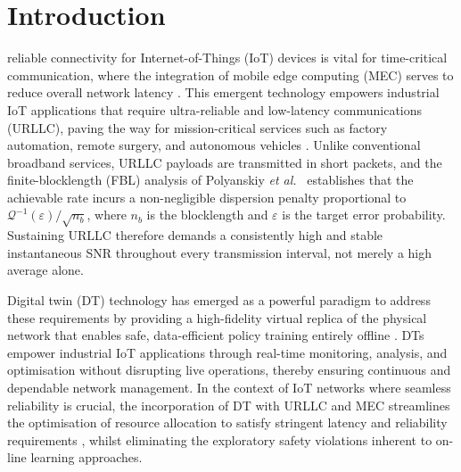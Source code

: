 \documentclass[journal]{IEEEtran}
\begin{document}
\section{Introduction}
\label{sec:intro}

 reliable connectivity for
Internet-of-Things (IoT) devices is vital for time-critical
communication, where the integration of mobile edge computing (MEC)
serves to reduce overall network latency \cite{mao2017survey}. This
emergent technology empowers industrial IoT applications that require
ultra-reliable and low-latency communications (URLLC), paving the way
for mission-critical services such as factory automation, remote
surgery, and autonomous vehicles \cite{durisi2016toward,she2021tutorial}.
Unlike conventional broadband services, URLLC payloads are transmitted
in short packets, and the finite-blocklength (FBL) analysis of
Polyanskiy \emph{et al.}~\cite{polyanskiy2010channel} establishes that
the achievable rate incurs a non-negligible dispersion penalty
proportional to $\mathcal{Q}^{-1}(\varepsilon)/\sqrt{n_b}$, where
$n_b$ is the blocklength and $\varepsilon$ is the target error
probability. Sustaining URLLC therefore demands a consistently high
and stable instantaneous SNR throughout every transmission interval,
not merely a high average alone.

Digital twin (DT) technology has emerged as a powerful paradigm to
address these requirements by providing a high-fidelity virtual
replica of the physical network that enables safe, data-efficient
policy training entirely offline
\cite{paul2024active,kurma2024ris,masaracchia2025dt}. DTs empower
industrial IoT applications through real-time monitoring, analysis,
and optimisation without disrupting live operations, thereby ensuring
continuous and dependable network management. In the context of IoT
networks where seamless reliability is crucial, the incorporation of
DT with URLLC and MEC streamlines the optimisation of resource
allocation to satisfy stringent latency and reliability requirements
\cite{kurma2024activeris,lestari2024icc}, whilst eliminating the
exploratory safety violations inherent to on-line learning approaches.
\end{document}
